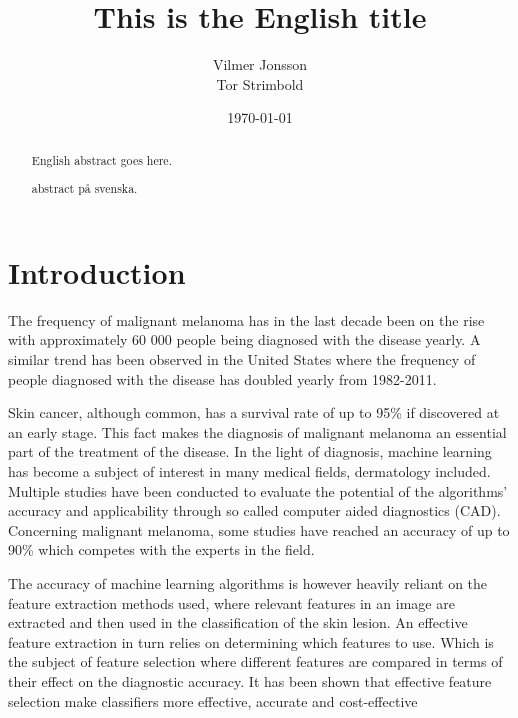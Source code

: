 \documentclass{kththesis}
\title{This is the English title}
\author{Vilmer Jonsson \\ Tor Strimbold}
\date{\today}
\begin{document}
\frontmatter

\titlepage

\begin{abstract}
  English abstract goes here.

  \blindtext
\end{abstract}


\begin{otherlanguage}{swedish}
  \begin{abstract}
    abstract på svenska.
  \end{abstract}
\end{otherlanguage}


\tableofcontents


\mainmatter


\chapter{Introduction}
The frequency of malignant melanoma has in the last decade been on the rise with approximately 60 000 people being diagnosed with the disease yearly. %
A similar trend has been observed in the United States where the frequency of people diagnosed with the disease has doubled yearly from 1982-2011.%

Skin cancer, although common, has a survival rate of up to 95\% if discovered at an early stage. %
This fact makes the diagnosis of malignant melanoma an essential part of the treatment of the disease. In the light of diagnosis, machine learning has become a subject of interest in many medical fields, dermatology included. Multiple studies have been conducted to evaluate the potential of the algorithms’ accuracy and applicability through so called computer aided diagnostics (CAD). Concerning malignant melanoma, some studies have reached an accuracy of up to 90\% which competes with the experts in the field. %

The accuracy of machine learning algorithms is however heavily reliant on the feature extraction methods used, where relevant features in an image are extracted and then used in the classification of the skin lesion. An effective feature extraction in turn relies on determining which features to use. Which is the subject of feature selection where different features are compared in terms of their effect on the diagnostic accuracy. It has been shown that effective feature selection make classifiers more effective, accurate and cost-effective %
\end{document}
